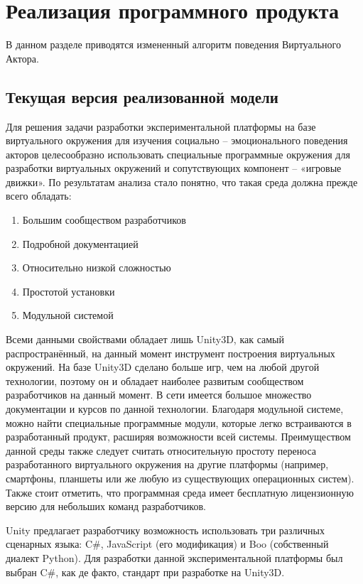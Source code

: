 \chapter{Реализация программного продукта}

В данном разделе приводятся измененный алгоритм поведения Виртуального Актора.

\section{Текущая версия реализованной модели}

Для решения задачи разработки экспериментальной платформы на базе виртуального окружения для изучения социально – эмоционального поведения 
акторов целесообразно использовать специальные программные окружения для разработки виртуальных окружений и сопутствующих компонент – «игровые движки». 
По результатам анализа стало понятно, что такая среда должна прежде всего обладать:
\begin{enumerate}
  \item Большим сообществом разработчиков
  \item Подробной документацией
  \item Относительно низкой сложностью
  \item Простотой установки
  \item Модульной системой
\end{enumerate}

Всеми данными свойствами обладает лишь Unity3D, как самый распространённый, на данный момент инструмент построения виртуальных окружений. 
На базе Unity3D сделано больше игр, чем на любой другой технологии, поэтому он и обладает наиболее развитым сообществом разработчиков на данный момент. 
В сети имеется большое множество документации и курсов по данной технологии. Благодаря модульной системе, можно найти специальные программные модули, 
которые легко встраиваются в разработанный продукт, расширяя возможности всей системы.  Преимуществом данной среды также следует считать относительную 
простоту переноса разработанного виртуального окружения на другие платформы (например, смартфоны, планшеты или же любую из существующих операционных систем). 
Также стоит отметить, что программная среда имеет бесплатную лицензионную версию для небольших команд разработчиков.

Unity предлагает разработчику возможность использовать три различных сценарных языка: C\#, JavaScript (его модификация) и Boo (собственный диалект Python). 
Для разработки данной экспериментальной платформы был выбран C\#, как де факто, стандарт при разработке на Unity3D. 

